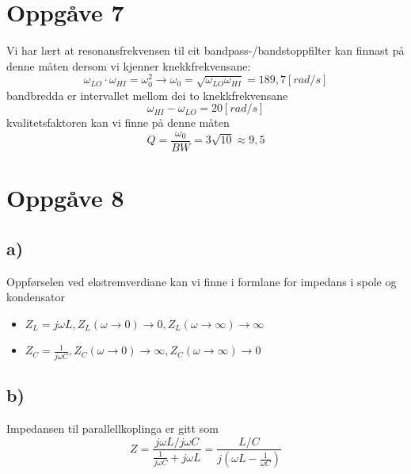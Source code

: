 \documentclass[12pt,a4paper]{article}
\begin{document}
  \section*{Oppgåve 7}
    Vi har lært at resonansfrekvensen til eit bandpass-/bandstoppfilter kan
    finnast på denne måten dersom vi kjenner knekkfrekvensane:
    \begin{equation}
      \omega_{LO}\cdot\omega_{HI} = \omega_0^2 \rightarrow
      \omega_0 = \sqrt{\omega_{LO}\omega_{HI}} = 189,7[rad/s]
    \end{equation}
    bandbredda er intervallet mellom dei to knekkfrekvensane
    \begin{equation}
      \omega_{HI} - \omega_{LO} = 20[rad/s]
    \end{equation}
    kvalitetsfaktoren kan vi finne på denne måten
    \begin{equation}
      Q = \frac{\omega_0}{BW} = 3\sqrt{10} \approx  9,5
    \end{equation}

  \section*{Oppgåve 8}
    \subsection*{a)}
    Oppførselen ved ekstremverdiane kan vi finne i formlane for impedans i spole og
    kondensator
    \begin{itemize}
      \item $Z_L = j\omega L, Z_L(\omega \rightarrow 0) \rightarrow 0,
        Z_L(\omega \rightarrow \infty) \rightarrow \infty$
      \item $Z_C = \frac{1}{j\omega C}, Z_C(\omega \rightarrow 0) \rightarrow \infty,
        Z_C(\omega \rightarrow \infty) \rightarrow 0$
    \end{itemize}

    \subsection*{b)}
    Impedansen til parallellkoplinga er gitt som
    \begin{equation}
      Z = \frac{j\omega L/j\omega C}{\frac{1}{j\omega C} + j\omega L} =
      \frac{L/C}{j(\omega L - \frac{1}{\omega C})}
    \end{equation}
\end{document}
